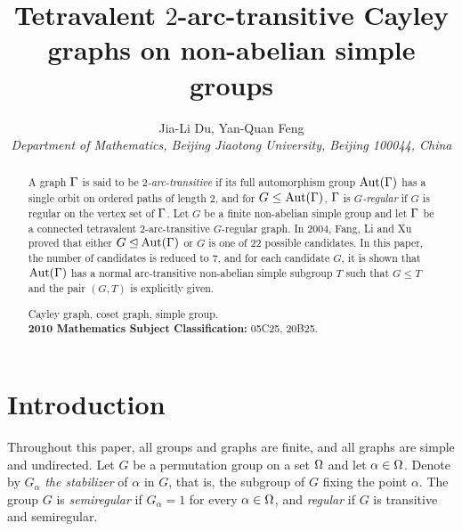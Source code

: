 \documentclass[12pt]{article}
\def\a{\alpha} \def\b{\beta} \def\g{\gamma} \def\d{\delta} \def\e{\varepsilon}
\def\f{\noindent}
\def\Aut{\hbox{\rm Aut}}
\begin{document}
\title{Tetravalent $2$-arc-transitive Cayley graphs on non-abelian simple groups}


\author{Jia-Li Du, Yan-Quan Feng\footnotemark\\
{\small\em Department of Mathematics, Beijing
Jiaotong University, Beijing 100044, China}}


\date{}
 \maketitle

\begin{abstract}

A graph $\Gamma$ is said to be {\em $2$-arc-transitive} if  its full automorphism group $\Aut(\G)$ has a single orbit on ordered paths of length $2$, and for $G\leq \Aut(\G)$, $\Gamma$ is {\em $G$-regular} if $G$ is regular on the vertex set of $\Gamma$. Let $G$ be a finite non-abelian simple group and let $\Gamma$ be a
connected tetravalent $2$-arc-transitive $G$-regular graph. In 2004, Fang, Li and Xu proved that either $G\unlhd \Aut(\G)$ or $G$ is one of $22$ possible candidates. In this paper, the number of candidates is reduced to $7$, and for each candidate $G$, it is shown that $\Aut(\G)$ has a normal arc-transitive non-abelian simple subgroup $T$ such that $G\leq T$ and the pair $(G,T)$ is explicitly given.

\bigskip
\f {\bf Keywords:} Cayley graph, coset graph, simple group.\\
{\bf 2010 Mathematics Subject Classification:} 05C25, 20B25.

\end{abstract}

\section{Introduction}

Throughout this paper, all groups and graphs are finite, and all graphs are simple and undirected. Let $G$ be a permutation group on a set $\Omega$ and let $\a\in \O$. Denote by $G_{\a}$ {\it the stabilizer} of $\a$ in $G$, that is, the subgroup of $G$ fixing the point $\a$. The group $G$ is {\it semiregular} if $G_{\a}=1$ for every $\a\in\O$, and {\it regular} if $G$ is transitive and semiregular.
\end{document}
